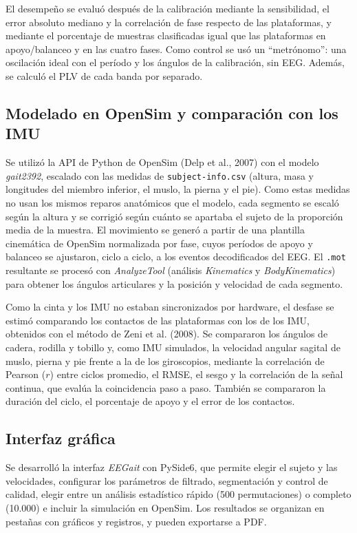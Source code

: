 \documentclass[10pt]{article}
\begin{document}
El desempeño se evaluó después de la calibración mediante la sensibilidad, el error absoluto mediano y la correlación de fase respecto de las plataformas, y mediante el porcentaje de muestras clasificadas igual que las plataformas en apoyo/balanceo y en las cuatro fases. Como control se usó un ``metrónomo'': una oscilación ideal con el período y los ángulos de la calibración, sin EEG. Además, se calculó el PLV de cada banda por separado.

\subsection{Modelado en OpenSim y comparación con los IMU}

Se utilizó la API de Python de OpenSim (Delp et al., 2007) con el modelo \textit{gait2392}, escalado con las medidas de \texttt{subject-info.csv} (altura, masa y longitudes del miembro inferior, el muslo, la pierna y el pie). Como estas medidas no usan los mismos reparos anatómicos que el modelo, cada segmento se escaló según la altura y se corrigió según cuánto se apartaba el sujeto de la proporción media de la muestra. El movimiento se generó a partir de una plantilla cinemática de OpenSim normalizada por fase, cuyos períodos de apoyo y balanceo se ajustaron, ciclo a ciclo, a los eventos decodificados del EEG. El \texttt{.mot} resultante se procesó con \textit{AnalyzeTool} (análisis \textit{Kinematics} y \textit{BodyKinematics}) para obtener los ángulos articulares y la posición y velocidad de cada segmento.

Como la cinta y los IMU no estaban sincronizados por hardware, el desfase se estimó comparando los contactos de las plataformas con los de los IMU, obtenidos con el método de Zeni et al. (2008). Se compararon los ángulos de cadera, rodilla y tobillo y, como IMU simulados, la velocidad angular sagital de muslo, pierna y pie frente a la de los giroscopios, mediante la correlación de Pearson ($r$) entre ciclos promedio, el RMSE, el sesgo y la correlación de la señal continua, que evalúa la coincidencia paso a paso. También se compararon la duración del ciclo, el porcentaje de apoyo y el error de los contactos.

\subsection{Interfaz gráfica}

Se desarrolló la interfaz \textit{EEGait} con PySide6, que permite elegir el sujeto y las velocidades, configurar los parámetros de filtrado, segmentación y control de calidad, elegir entre un análisis estadístico rápido (500 permutaciones) o completo (10.000) e incluir la simulación en OpenSim. Los resultados se organizan en pestañas con gráficos y registros, y pueden exportarse a PDF.
\end{document}
